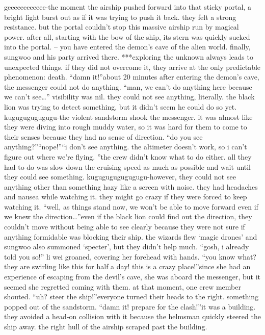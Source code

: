 geeeeeeeeeeee-the moment the airship pushed forward into that sticky portal, a bright light burst out as if it was trying to push it back.
 they felt a strong resistance.
 but the portal couldn’t stop this massive airship run by magical power.
 after all, starting with the bow of the ship, its stern was quickly sucked into the portal.
– you have entered the demon’s cave of the alien world.
finally, sungwoo and his party arrived there.
***exploring the unknown always leads to unexpected things.
 if they did not overcome it, they arrive at the only predictable phenomenon: death.
“damn it!”about 20 minutes after entering the demon’s cave, the messenger could not do anything.
“man, we can’t do anything here because we can’t see…”
visibility was nil.
 they could not see anything, literally.
 the black lion was trying to detect something, but it didn’t seem he could do so yet.
kugugugugugugu-the violent sandstorm shook the messenger.
 it was almost like they were diving into rough muddy water, so it was hard for them to come to their senses because they had no sense of direction.
“do you see anything?”“nope!”“i don’t see anything.
 the altimeter doesn’t work, so i can’t figure out where we’re flying.
”the crew didn’t know what to do either.
 all they had to do was slow down the cruising speed as much as possible and wait until they could see something.
kugugugugugugugu-however, they could not see anything other than something hazy like a screen with noise.
 they had headaches and nausea while watching it.
 they might go crazy if they were forced to keep watching it.
“well, as things stand now, we won’t be able to move forward even if we knew the direction…”even if the black lion could find out the direction, they couldn’t move without being able to see clearly because they were not sure if anything formidable was blocking their ship.
the wizards flew ‘magic drones’ and sungwoo also summoned ‘specter’, but they didn’t help much.
“gosh, i already told you so!” li wei groaned, covering her forehead with hands.
 “you know what? they are swirling like this for half a day! this is a crazy place!”since she had an experience of escaping from the devil’s cave, she was aboard the messenger, but it seemed she regretted coming with them.
at that moment, one crew member shouted.
“uh? steer the ship!”everyone turned their heads to the right.
 something popped out of the sandstorm.
“damn it! prepare for the clash!”it was a building.
 they avoided a head-on collision with it because the helmsman quickly steered the ship away.
the right hull of the airship scraped past the building.
